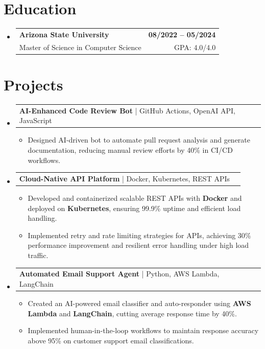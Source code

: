 \documentclass[letterpaper,11pt]{article}
\makeatletter
\newcommand{\resumeItem}[1]{
  \item\footnotesize{
    {#1 \vspace{-2pt}}
  }
}
\newcommand{\educationSubheading}[4]{
  \vspace{-2pt}\item
    \begin{tabular*}{1.0\textwidth}[t]{l@{\extracolsep{\fill}}r}
      \textbf{\small #1} & \textbf{\small #2} \\
      {\small#3} & {\small #4} \\
    \end{tabular*}\vspace{-7pt}
}
\newcommand{\resumeProjectHeading}[2]{
    \item
    \begin{tabular*}{1.001\textwidth}{l@{\extracolsep{\fill}}r}
      \small#1 & \textbf{\small #2}\\
    \end{tabular*}\vspace{-7pt}
}
\newcommand{\resumeSubHeadingListStart}{\begin{itemize}[leftmargin=0pt, label={}]}
\newcommand{\resumeSubHeadingListEnd}{\end{itemize}}
\newcommand{\resumeItemListStart}{\begin{itemize}[leftmargin=*]}
\newcommand{\resumeItemListEnd}{\end{itemize}\vspace{-5pt}}
\makeatother
\begin{document}
\section{Education}
  \resumeSubHeadingListStart
    \educationSubheading
      {Arizona State University}{08/2022 -- 05/2024}
      {Master of Science in Computer Science}{GPA: 4.0/4.0}
  \resumeSubHeadingListEnd

\section{Projects}
    \vspace{-5pt}
    \resumeSubHeadingListStart
          \resumeProjectHeading
              {\textbf{AI-Enhanced Code Review Bot} | GitHub Actions, OpenAI API, JavaScript}{}
        \resumeItemListStart
            \resumeItem{Designed AI-driven bot to automate pull request analysis and generate documentation, reducing manual review efforts by 40\% in CI/CD workflows.}
        \resumeItemListEnd
        \vspace{-12pt}
    
    \resumeProjectHeading
        {\textbf{Cloud-Native API Platform} | Docker, Kubernetes, REST APIs}{}
        \resumeItemListStart
            \resumeItem{Developed and containerized scalable REST APIs with \textbf{Docker} and deployed on \textbf{Kubernetes}, ensuring 99.9\% uptime and efficient load handling.}
            \resumeItem{Implemented retry and rate limiting strategies for APIs, achieving 30\% performance improvement and resilient error handling under high load traffic.}
        \resumeItemListEnd
          \vspace{-12pt}
      \resumeProjectHeading
          {\textbf{Automated Email Support Agent} | Python, AWS Lambda, LangChain}{}
          \resumeItemListStart
              \resumeItem{Created an AI-powered email classifier and auto-responder using \textbf{AWS Lambda} and \textbf{LangChain}, cutting average response time by 40\%.}
              \resumeItem{Implemented human-in-the-loop workflows to maintain response accuracy above 95\% on customer support email classifications.}
          \resumeItemListEnd 
    \resumeSubHeadingListEnd
\end{document}
